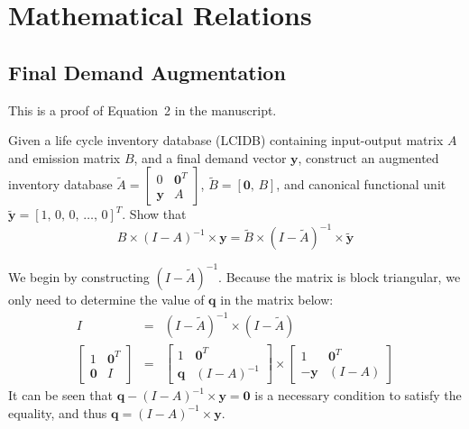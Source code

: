 \section{Mathematical Relations}

\subsection{Final Demand Augmentation}

This is a proof of Equation~2 in the manuscript.  

Given a life cycle inventory database (LCIDB) containing input-output matrix $A$ and emission matrix $B$, and a final demand vector $\mathbf{y}$, construct an augmented inventory database
$\tilde{A} = \left[\begin{smallmatrix} 0 & \mathbf{0}^T \\ \mathbf{y} & A \end{smallmatrix}\right]$,
$\tilde{B} = [ \mathbf{0},\, B ]$, and canonical functional unit $\tilde{\mathbf{y}} =  [ 1,\, 0,\, 0 ,\,\ldots,\, 0]^{T}$.  Show that
\begin{equation} B\times\left(I-A\right)^{-1}\times\mathbf{y} = \tilde{B}\times\left(I-\tilde{A}\right)^{-1}\times\tilde{\mathbf{y}}
\end{equation}

We begin by constructing $(I-\tilde{A})^{-1}$.  Because the matrix is block triangular, we only need to determine the value of $\mathbf{q}$ in the matrix below:
\begin{eqnarray}
  I &=&  (I-\tilde{A})^{-1}\times(I-\tilde{A})\\
  \left[\begin{array}{cc} 1 & \mathbf{0}^T \\
    \mathbf{0} & I
  \end{array}\right] &=&
  \left[\begin{array}{cc} 1 & \mathbf{0}^T \\
      \mathbf{q} & (I-A)^{-1}
  \end{array}\right]\times
  \left[\begin{array}{cc} 1 & \mathbf{0}^T \\
      -\mathbf{y} & (I-A)
        \end{array}\right]
\end{eqnarray}
It can be seen that $\mathbf{q}-(I-A)^{-1}\times\mathbf{y}=\mathbf{0}$ is a necessary condition to satisfy the equality, and thus $\mathbf{q}=(I-A)^{-1}\times\mathbf{y}$.

